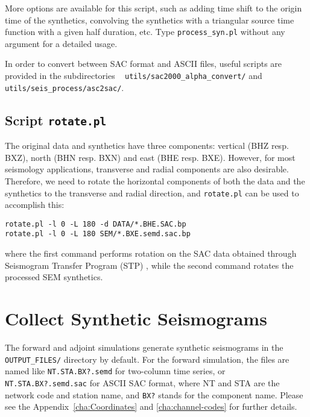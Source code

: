 More options are available for this script, such as adding time shift
to the origin time of the synthetics, convolving the synthetics with
a triangular source time function with a given half duration, etc.
Type \texttt{process\_syn.pl} without any argument for a detailed
usage.\newline

In order to convert between SAC format and ASCII files, useful scripts
are provided in the subdirectories ~\newline
 \texttt{utils/sac2000\_alpha\_convert/} and \texttt{utils/seis\_process/asc2sac/}.


\subsection{Script \texttt{rotate.pl}}

The original data and synthetics have three components: vertical (BHZ
resp. BXZ), north (BHN resp. BXN) and east (BHE resp. BXE). However,
for most seismology applications, transverse and radial components
are also desirable. Therefore, we need to rotate the horizontal components
of both the data and the synthetics to the transverse and radial direction,
and \texttt{\small rotate.pl}{\small{} can be used to accomplish this:}{\small \par}
\begin{verbatim}
rotate.pl -l 0 -L 180 -d DATA/*.BHE.SAC.bp
rotate.pl -l 0 -L 180 SEM/*.BXE.semd.sac.bp
\end{verbatim}
where the first command performs rotation on the SAC data obtained
through Seismogram Transfer Program (STP) ,
while the second command rotates the processed SEM synthetics.


\section{Collect Synthetic Seismograms}

The forward and adjoint simulations generate synthetic seismograms
in the \texttt{OUTPUT\_FILES/} directory by default. For the forward
simulation, the files are named like \texttt{NT.STA.BX?.semd} for
two-column time series, or \texttt{NT.STA.BX?.semd.sac} for ASCII
SAC format, where NT and STA are the network code and station name,
and \texttt{BX?} stands for the component name. Please see the Appendix~\ref{cha:Coordinates}
and \ref{cha:channel-codes} for further details.\newline

